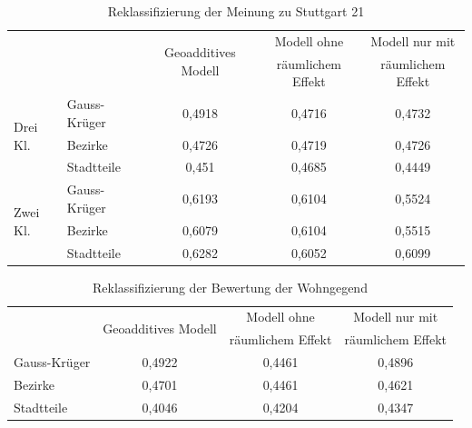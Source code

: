 \documentclass{Vorlage}
\begin{document}
\begin{table}[h]
\centering
\caption{Reklassifizierung der Meinung zu Stuttgart 21}
\label{evalS21}
\begin{tabular}{ll|c|c|c}
\hline \hline
                          &              & \multirow{2}{*}{Geoadditives Modell} & Modell ohne       & Modell nur mit    \\
                          &              &                                      & räumlichem Effekt & räumlichem Effekt \\ \hline
\multirow{3}{*}{Drei Kl.} & Gauss-Krüger & 0,4918                               & 0,4716            & 0,4732            \\
                          & Bezirke      & 0,4726                               & 0,4719            & 0,4726            \\
                          & Stadtteile   & 0,451                                & 0,4685            & 0,4449            \\ \hline
\multirow{3}{*}{Zwei Kl.} & Gauss-Krüger & 0,6193                               & 0,6104            & 0,5524            \\
                          & Bezirke      & 0,6079                               & 0,6104            & 0,5515            \\
                          & Stadtteile   & 0,6282                               & 0,6052            & 0,6099            \\ \hline \hline
\end{tabular}
\end{table}

\begin{table}[h]
\centering
\caption{Reklassifizierung der Bewertung der Wohngegend}
\label{evalB}
\begin{tabular}{l|c|c|c}
\hline \hline
             & \multirow{2}{*}{Geoadditives Modell} & Modell ohne       & Modell nur mit    \\
             &                                      & räumlichem Effekt & räumlichem Effekt \\ \hline
Gauss-Krüger & 0,4922                               & 0,4461            & 0,4896            \\
Bezirke      & 0,4701                               & 0,4461            & 0,4621            \\
Stadtteile   & 0,4046                               & 0,4204            & 0,4347            \\ \hline \hline
\end{tabular}
\end{table}
\end{document}
